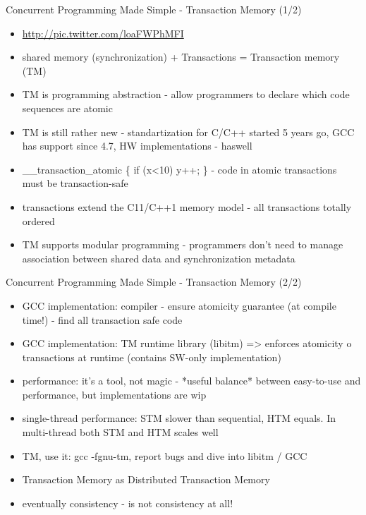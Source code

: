 \documentclass[aspectratio=169]{beamer}
\begin{document}
\begin{frame}{Concurrent Programming Made Simple - Transaction Memory (1/2)}
  \begin{itemize}
  \item \url{http://pic.twitter.com/loaFWPhMFI}
  \item shared memory (synchronization) + Transactions = Transaction memory (TM)
  \item TM is programming abstraction - allow programmers to declare which code sequences are atomic
  \item TM is still rather new - standartization for C/C++ started 5 years go, GCC has support since 4.7, HW implementations - haswell
  \item \_\_transaction\_atomic \{ if (x<10) y++; \} - code in atomic transactions must be transaction-safe
  \item transactions extend the C11/C++1 memory model - all transactions totally ordered
  \item TM supports modular programming - programmers don't need to manage association between shared data and synchronization metadata
  \end{itemize}
\end{frame}
  
\begin{frame}{Concurrent Programming Made Simple - Transaction Memory (2/2)}
  \begin{itemize}
  \item GCC implementation: compiler - ensure atomicity guarantee (at compile time!) - find all transaction safe code
  \item GCC implementation: TM runtime library (libitm) => enforces atomicity o transactions at runtime (contains SW-only implementation)
  \item performance: it's a tool, not magic - *useful balance* between easy-to-use and performance, but implementations are wip
  \item single-thread performance: STM slower than sequential, HTM equals. In multi-thread both STM and HTM scales well
  \item TM, use it: gcc -fgnu-tm, report bugs and dive into libitm / GCC
  \item Transaction Memory as Distributed Transaction Memory
  \item eventually consistency - is not consistency at all!
  \end{itemize}
\end{frame}
\end{document}

